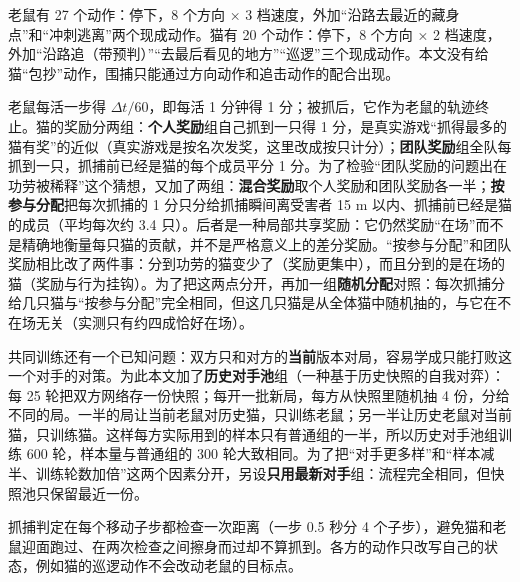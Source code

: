 老鼠有 27 个动作：停下，8 个方向 × 3 档速度，外加“沿路去最近的藏身点”和“冲刺逃离”两个现成动作。猫有 20 个动作：停下，8 个方向 × 2 档速度，外加“沿路追（带预判）”“去最后看见的地方”“巡逻”三个现成动作。本文没有给猫“包抄”动作，围捕只能通过方向动作和追击动作的配合出现。

老鼠每活一步得 $\Delta t/60$，即每活 1 分钟得 1 分；被抓后，它作为老鼠的轨迹终止。猫的奖励分两组：\textbf{个人奖励}组自己抓到一只得 1 分，是真实游戏“抓得最多的猫有奖”的近似（真实游戏是按名次发奖，这里改成按只计分）；\textbf{团队奖励}组全队每抓到一只，抓捕前已经是猫的每个成员平分 1 分。为了检验“团队奖励的问题出在功劳被稀释”这个猜想，又加了两组：\textbf{混合奖励}取个人奖励和团队奖励各一半；\textbf{按参与分配}把每次抓捕的 1 分只分给抓捕瞬间离受害者 15 m 以内、抓捕前已经是猫的成员（平均每次约 3.4 只）。后者是一种局部共享奖励：它仍然奖励“在场”而不是精确地衡量每只猫的贡献，并不是严格意义上的差分奖励。“按参与分配”和团队奖励相比改了两件事：分到功劳的猫变少了（奖励更集中），而且分到的是在场的猫（奖励与行为挂钩）。为了把这两点分开，再加一组\textbf{随机分配}对照：每次抓捕分给几只猫与“按参与分配”完全相同，但这几只猫是从全体猫中随机抽的，与它在不在场无关（实测只有约四成恰好在场）。

共同训练还有一个已知问题：双方只和对方的\textbf{当前}版本对局，容易学成只能打败这一个对手的对策。为此本文加了\textbf{历史对手池}组（一种基于历史快照的自我对弈）：每 25 轮把双方网络存一份快照；每开一批新局，每方从快照里随机抽 4 份，分给不同的局。一半的局让当前老鼠对历史猫，只训练老鼠；另一半让历史老鼠对当前猫，只训练猫。这样每方实际用到的样本只有普通组的一半，所以历史对手池组训练 600 轮，样本量与普通组的 300 轮大致相同。为了把“对手更多样”和“样本减半、训练轮数加倍”这两个因素分开，另设\textbf{只用最新对手}组：流程完全相同，但快照池只保留最近一份。

抓捕判定在每个移动子步都检查一次距离（一步 0.5 秒分 4 个子步），避免猫和老鼠迎面跑过、在两次检查之间擦身而过却不算抓到。各方的动作只改写自己的状态，例如猫的巡逻动作不会改动老鼠的目标点。

